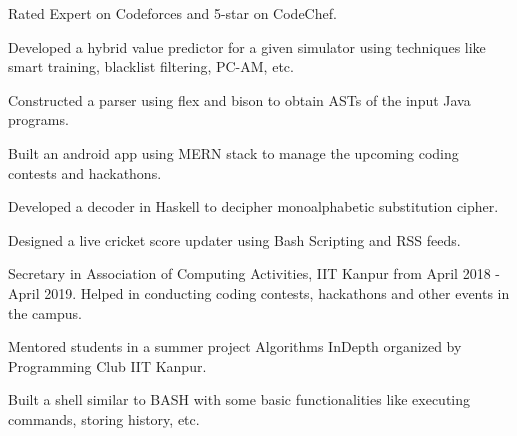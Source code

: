 \vspace{5pt}
{
\fontsize{10pt}{1.05em}\bodyfontlight\upshape\color{text}\selectfont

\begin{cvitems}
    \item {Rated Expert on Codeforces and 5-star on CodeChef.}
    \vspace{2pt}
    \item {Developed a hybrid value predictor for a given simulator using techniques like smart training, blacklist filtering, PC-AM, etc.}
    \vspace{2pt}
    \item {Constructed a parser using flex and bison to obtain ASTs of the input Java programs.}
    \vspace{2pt}
    \item {Built an android app using MERN stack to manage the upcoming coding contests and hackathons.}
    \vspace{2pt}
    \item {Developed a decoder in Haskell to decipher monoalphabetic substitution cipher.}
    \vspace{2pt}
    \item {Designed a live cricket score updater using Bash Scripting and RSS feeds.}
    \vspace{2pt}
    \item {Secretary in Association of Computing Activities, IIT Kanpur from April 2018 - April 2019. Helped in conducting coding contests, hackathons and other events in the campus.}
    \vspace{2pt}
    \item {Mentored students in a summer project Algorithms InDepth organized by Programming Club IIT Kanpur.}
    \vspace{2pt}
    \item {Built a shell similar to BASH with some basic functionalities like executing commands, storing history, etc.}

\end{cvitems}
}    